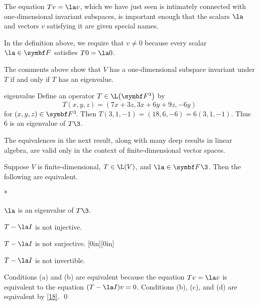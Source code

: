 The equation
$
Tv = \la v$,
which we have just seen is intimately connected with one-dimensional  invariant
subspaces, is important enough that the scalars $\la$ and vectors $v$ satisfying it
are given special names.



In the definition above, we require that $v \ne 0$ because every scalar $\la \in \F{}$ satisfies $T0 = \la 0$.

The comments above show that $V$ has a one-dimensional subspace invariant \mbox{under} $T$ if and only if $T$ has an eigenvalue.

\begin{example}{eigenvalue}
Define an operator $T \in \L\paren[\big]{\F3}$ by
\[
T(x,y,z) = (7x + 3z, 3x +6y + 9z, -6y)
\]
for $(x, y, z) \in \FF3$.
Then $T(3,1,-1) = (18, 6, -6) = 6(3,1,-1)$. Thus $6$ is an eigenvalue of $T\3$.
\end{example}

The equivalences in the next result, along with many deep results in linear algebra, are valid only in the context of finite-dimensional vector spaces.

{Suppose $V$ is finite-dimensional, $T \in \L(V)$, and $\la \in \F{}\3$. Then the following are equivalent.
\begin{subtheorem}*
\item
$\la$ is an eigenvalue of $T\3$.
\item
$T - \la I$ is not injective.
\item
$T - \la I$ is not surjective.  \hfill
\raisebox{0in}[0in][0in]{}
\item
$T - \la I$ is not invertible.
\end{subtheorem}}

\proof
Conditions (a) and (b) are equivalent because the equation
$Tv = \la v$ is equivalent to the equation $(T - \la I)v = 0$.  Conditions (b), (c), and (d) are equivalent by  \ref{18}. \qed

